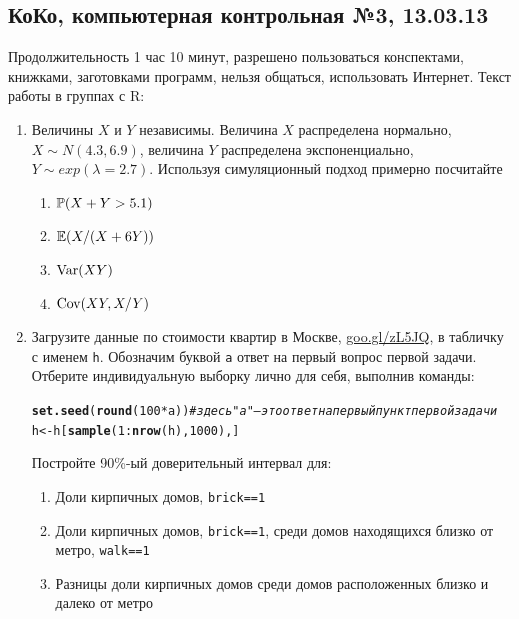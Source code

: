 \documentclass[12pt, a4paper]{article}\usepackage[]{graphicx}\usepackage[]{color}
\makeatletter
\newcommand{\hlnum}[1]{\textcolor[rgb]{0.686,0.059,0.569}{#1}}%
\newcommand{\hlcom}[1]{\textcolor[rgb]{0.678,0.584,0.686}{\textit{#1}}}%
\newcommand{\hlopt}[1]{\textcolor[rgb]{0,0,0}{#1}}%
\newcommand{\hlstd}[1]{\textcolor[rgb]{0.345,0.345,0.345}{#1}}%
\newcommand{\hlkwb}[1]{\textcolor[rgb]{0.69,0.353,0.396}{#1}}%
\newcommand{\hlkwd}[1]{\textcolor[rgb]{0.737,0.353,0.396}{\textbf{#1}}}%
\newenvironment{kframe}{%
	\def\at@end@of@kframe{}%
	\ifinner\ifhmode%
	\def\at@end@of@kframe{\end{minipage}}%
\begin{minipage}{\columnwidth}%
	\fi\fi%
	\def\FrameCommand##1{\hskip\@totalleftmargin \hskip-\fboxsep
		\colorbox{shadecolor}{##1}\hskip-\fboxsep
		\hskip-\linewidth \hskip-\@totalleftmargin \hskip\columnwidth}%
	\MakeFramed {\advance\hsize-\width
		\@totalleftmargin\z@ \linewidth\hsize
		\@setminipage}}%
{\par\unskip\endMakeFramed%
	\at@end@of@kframe}
\newenvironment{knitrout}{}{} %
\makeatother
\begin{document}
				\subsection{КоКо, компьютерная контрольная №3, 13.03.13}

				Продолжительность 1 час 10 минут, разрешено пользоваться конспектами, книжками, заготовками программ, нельзя общаться, использовать Интернет. Текст работы в группах с R:

				\begin{enumerate}
					\item Величины $X$ и $Y$ независимы. Величина $X$ распределена нормально, $X\sim N(4.3,6.9)$, величина $Y$ распределена экспоненциально, $Y\sim exp(\lambda=2.7)$. Используя симуляционный подход примерно посчитайте

					\begin{enumerate}
						\item $\P(X+Y>5.1)$
						\item $\E(X/(X+6Y))$
						\item $\Var(XY)$
						\item $\Cov(XY,X/Y)$
					\end{enumerate}

					\item Загрузите данные по стоимости квартир в Москве, \href{http://goo.gl/zL5JQ}{goo.gl/zL5JQ}, в табличку с именем \verb|h|. Обозначим буквой \verb|a| ответ на первый вопрос первой задачи. Отберите индивидуальную выборку лично для себя, выполнив команды:
					\begin{knitrout}
						\color{fgcolor}\begin{kframe}
							\begin{alltt}
								\hlkwd{set.seed}\hlstd{(}\hlkwd{round}\hlstd{(}\hlnum{100} \hlopt{*} \hlstd{a))} \hlcom{# здесь "a" — это ответ на первый пункт первой задачи}
								\hlstd{h} \hlkwb{<-} \hlstd{h[}\hlkwd{sample}\hlstd{(}\hlnum{1}\hlopt{:}\hlkwd{nrow}\hlstd{(h),} \hlnum{1000}\hlstd{), ]}
							\end{alltt}
						\end{kframe}
					\end{knitrout}

					Постройте 90\%-ый доверительный интервал для:
					\begin{enumerate}
						\item Доли кирпичных домов, \verb|brick==1|
						\item Доли кирпичных домов, \verb|brick==1|, среди домов находящихся близко от метро,  \verb|walk==1|
						\item Разницы доли кирпичных домов среди домов расположенных близко и далеко от метро
					\end{enumerate}



\end{enumerate}
\end{document}
